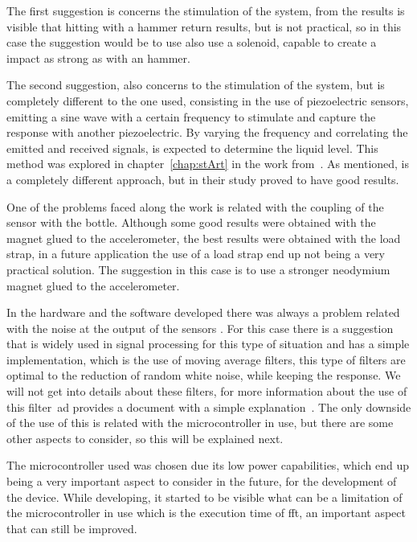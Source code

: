 The first suggestion is concerns the stimulation of the system, from the results is visible that hitting with a hammer return results, but is not practical, so in this case the suggestion would be to use also use a solenoid, capable to create a impact as strong as with an hammer.

The second suggestion, also concerns to the stimulation of the system, but is completely different to the one used, consisting in the use of piezoelectric sensors, emitting a sine wave with a certain frequency to stimulate and capture the response with another piezoelectric. By varying the frequency and correlating the emitted and received signals, is expected to determine the liquid level. This method was explored in chapter~\ref{chap:stArt} in the work from~\citeauthor{jahnLevelSensorFluids2014a}\cite{jahnLevelSensorFluids2014a}. As mentioned, is a completely different approach, but in their study proved to have good results.   

One of the problems faced along the work is related with the coupling of the sensor with the bottle. Although some good results were obtained with the magnet glued to the accelerometer, the best results were obtained with the load strap, in a future application the use of a load strap end up not being a very practical solution. The suggestion in this case is to use a stronger neodymium magnet glued to the accelerometer.

In the hardware and the software developed there was always a problem related with the noise at the output of the sensors . For this case there is a suggestion that is widely used in signal processing for this type of situation and has a simple implementation, which is the use of moving average filters, this type of filters are optimal to the reduction of random white noise, while keeping the response. We will not get into details about these filters, for more information about the use of this filter~\acrlong{ad} provides a document with a simple explanation~\cite{smith1997scientist}. The only downside of the use of this is related with the microcontroller in use, but there are some other aspects to consider, so this will be explained next.

The microcontroller used was chosen due its low power capabilities, which end up being a very important aspect to consider in the future, for the development of the device. While developing, it started to be visible what can be a limitation of the microcontroller in use which is the execution time of \acrshort{fft}, an important aspect that can still be improved. 

